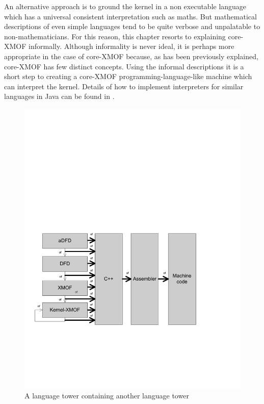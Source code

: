 An alternative approach is to ground the kernel in a non executable language which has a universal consistent interpretation such as maths.  But mathematical descriptions of even simple languages tend to be quite verbose and unpalatable to non-mathematicians.  For this reason, this chapter resorts to explaining core-XMOF informally.  Although informality is never ideal, it is perhaps more appropriate in the case of core-XMOF because, as has been previously explained, core-XMOF has few distinct concepts.  Using the informal descriptions it is a short step to creating a core-XMOF programming-language-like machine which can interpret the kernel.  Details of how to implement interpreters for similar languages in Java can be found in \cite{programLanguageProcessors}.


\begin{figure}[htb]
\begin{center}
\includegraphics[width=12cm]{MetaToolArchitecture/figures/towerOfTower.pdf}
\caption{A language tower containing another language tower}
\label{towerOfTower}
\end{center}
\end{figure}

